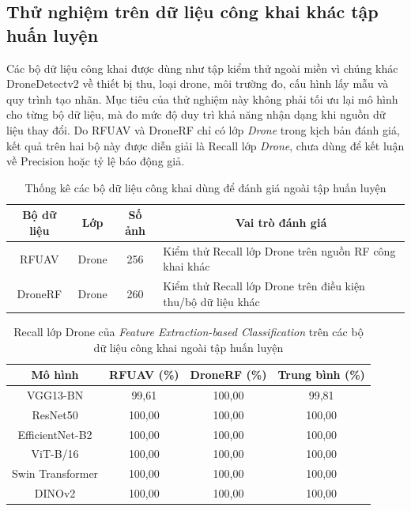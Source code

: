 \documentclass[../DoAn.tex]{subfiles}
\begin{document}
\subsection{Thử nghiệm trên dữ liệu công khai khác tập huấn luyện}

Các bộ dữ liệu công khai được dùng như tập kiểm thử ngoài miền vì chúng khác DroneDetectv2 về thiết bị thu, loại drone, môi trường đo, cấu hình lấy mẫu và quy trình tạo nhãn. Mục tiêu của thử nghiệm này không phải tối ưu lại mô hình cho từng bộ dữ liệu, mà đo mức độ duy trì khả năng nhận dạng khi nguồn dữ liệu thay đổi. Do RFUAV và DroneRF chỉ có lớp \textit{Drone} trong kịch bản đánh giá, kết quả trên hai bộ này được diễn giải là Recall lớp \textit{Drone}, chưa dùng để kết luận về Precision hoặc tỷ lệ báo động giả.

\begin{table}[H]
    \centering
   
    \renewcommand{\arraystretch}{1.3}
    \small
    \setlength{\tabcolsep}{4pt}
    \begin{tabular}{|c|c|c|p{}|}
        \hline
        \textbf{Bộ dữ liệu} & \textbf{Lớp} & \textbf{Số ảnh} & \multicolumn{1}{c|}{\textbf{Vai trò đánh giá}} \\ \hline
        RFUAV & Drone & 256 & Kiểm thử Recall lớp Drone trên nguồn RF công khai khác \\ \hline
        DroneRF & Drone & 260 & Kiểm thử Recall lớp Drone trên điều kiện thu/bộ dữ liệu khác \\ \hline
    \end{tabular}
    \caption{Thống kê các bộ dữ liệu công khai dùng để đánh giá ngoài tập huấn luyện}
    \label{tab:public_external_dataset_statistics}
\end{table}

\begin{table}[H]
    \centering
    \renewcommand{\arraystretch}{1.3}
    \small
    \setlength{\tabcolsep}{5pt}
    \begin{tabular}{|c|c|c|c|}
        \hline
        \textbf{Mô hình} & \textbf{RFUAV (\%)} & \textbf{DroneRF (\%)} & \textbf{Trung bình (\%)} \\ \hline
        VGG13-BN & 99,61 & 100,00 & 99,81 \\ \hline
        ResNet50 & 100,00 & 100,00 & 100,00 \\ \hline
        EfficientNet-B2 & 100,00 & 100,00 & 100,00 \\ \hline
        ViT-B/16 & 100,00 & 100,00 & 100,00 \\ \hline
        Swin Transformer & 100,00 & 100,00 & 100,00 \\ \hline
        DINOv2 & 100,00 & 100,00 & 100,00 \\ \hline
    \end{tabular}
    \caption{Recall lớp Drone của \textit{Feature Extraction-based Classification} trên các bộ dữ liệu công khai ngoài tập huấn luyện}
    \label{tab:feature_extraction_public_external_recall_results}
\end{table}
\end{document}
